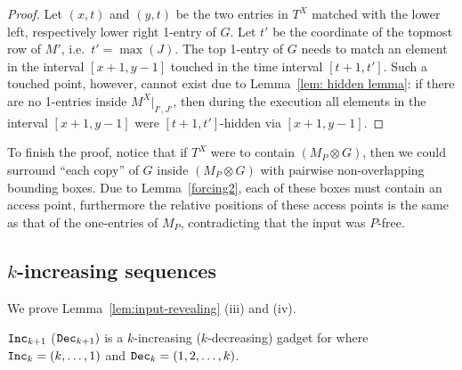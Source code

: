 \begin{proof}
Let $(x,t)$ and $(y,t)$ be the two entries in $T^X$ matched with the lower left, respectively lower right 1-entry of $G$. Let $t'$ be the coordinate of the topmost row of $M'$, i.e.\ $t' = \max{(J)}$. The top 1-entry of $G$ needs to match an element in the interval $[x+1, y-1]$ touched in the time interval $[t+1,t']$. Such a touched point, however, cannot exist due to Lemma~\ref{lem: hidden lemma}: if there are no 1-entries inside $M^X|_{I',J'}$, then during the \greedy execution all elements in the interval $[x+1, y-1]$ were $[t+1,t']$-hidden via $[x+1, y-1]$.
\end{proof}

To finish the proof, notice that if $T^X$ were to contain $(M_P \otimes G)$, then we could surround ``each copy'' of $G$ inside $(M_P \otimes G)$ with pairwise non-overlapping bounding boxes. Due to Lemma~\ref{forcing2}, each of these boxes must contain an access point, furthermore the relative positions of these access points is the same as that of the one-entries of $M_P$, contradicting that the input was $P$-free.
\fi
\subsection{$k$-increasing sequences}
\label{sub:k inc seq}
We prove Lemma~\ref{lem:input-revealing} (iii) and (iv).   

\begin{lemma}
$\texttt{Inc}_{k+1}$ ($\texttt{Dec}_{k+1})$ is a $k$-increasing ($k$-decreasing)
		gadget for \greedy where $\texttt{Inc}_{k}=(k,\dots,1)$ and \textup{$\texttt{Dec}_{k}=(1,2,\dots,k)$}. 
\end{lemma}

